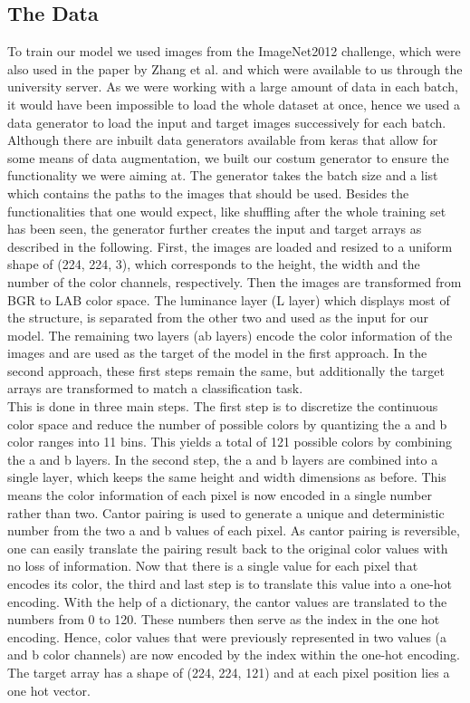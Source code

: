 \documentclass[12pt,letterpaper]{article}
\begin{document}
\subsection{The Data}
To train our model we used images from the ImageNet2012 challenge, which were also used in the paper by Zhang et al. and which were available to us through the university server. As we were working with a large amount of data in each batch, it would have been impossible to load the whole dataset at once, hence we used a data generator to load the input and target images successively for each batch. Although there are inbuilt data generators available from keras that allow for some means of data augmentation, we built our costum generator to ensure the functionality we were aiming at. The generator takes the batch size and a list which contains the paths to the images that should be used. Besides the functionalities that one would expect, like shuffling after the whole training set has been seen, the generator further creates the input and target arrays as described in the following.
First, the images are loaded and resized to a uniform shape of (224, 224, 3), which corresponds to the height, the width and the number of the color channels, respectively. Then the images are transformed from BGR to LAB color space. The luminance layer (L layer) which displays most of the structure, is separated from the other two and used as the input for our model.  The remaining two layers (ab layers) encode the color information of the images and are used as the target of the model in the first approach. In the second approach, these first steps remain the same, but additionally the target arrays are transformed to match a classification task.\\
This is done in three main steps. The first step is to discretize the continuous color space and reduce the number of possible colors by quantizing the a and b color ranges into 11 bins. This yields a total of 121 possible colors by combining the a and b layers. In the second step, the a and b layers are combined into a single layer, which keeps the same height and width dimensions as before. This means the color information of each pixel is now encoded in a single number rather than two. Cantor pairing is used to generate a unique and deterministic number from the two a and b values of each pixel. As cantor pairing is reversible, one can easily translate the pairing result back to the original color values with no loss of information. Now that there is a single value for each pixel that encodes its color, the third and last step is to translate this value into a one-hot encoding. With the help of a dictionary, the cantor values are translated to the numbers from 0 to 120. These numbers then serve as the index in the one hot encoding. Hence, color values that were previously represented in two values (a and b color channels) are now encoded by the index within the one-hot encoding. The target array has a shape of (224, 224, 121) and at each pixel position lies a one hot vector.\\
\end{document}

